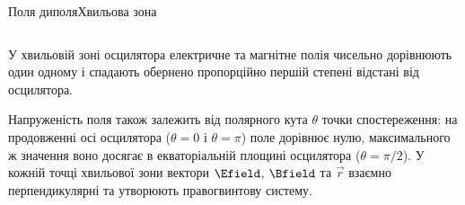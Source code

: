 \documentclass[onlytextwidth]{beamer}
\let\vect\vec
\begin{document}
\begin{frame}{Поля диполя}{Хвильова зона}
\begin{columns}
\begin{column}{0.4\linewidth}
\begin{overprint}
\begin{center}
\begin{pict}
					\end{pict}
				\end{center}
			\end{overprint}
		\end{column}
	\end{columns}
	\begin{overprint}
		\begin{alertblock}{}\justifying
			У хвильовій зоні осцилятора електричне та магнітне полія чисельно дорівнюють один одному і спадають обернено пропорційно першій степені відстані від осцилятора.
		\end{alertblock}
		\begin{alertblock}{}\justifying
			Напруженість поля також залежить від полярного
			кута $\theta$ точки спостереження: на продовженні осі осцилятора ($ \theta = 0 $ і $ \theta = \pi $) поле дорівнює нулю, максимального ж
			значення воно досягає в екваторіальній площині осцилятора ($ \theta = \pi/2 $). У кожній точці хвильової зони вектори $ \Efield $, $ \Bfield $ та $ \vect{r} $ взаємно перпендикулярні та утворюють правогвинтову систему.
		\end{alertblock}
	\end{overprint}

\end{frame}
\end{document}
